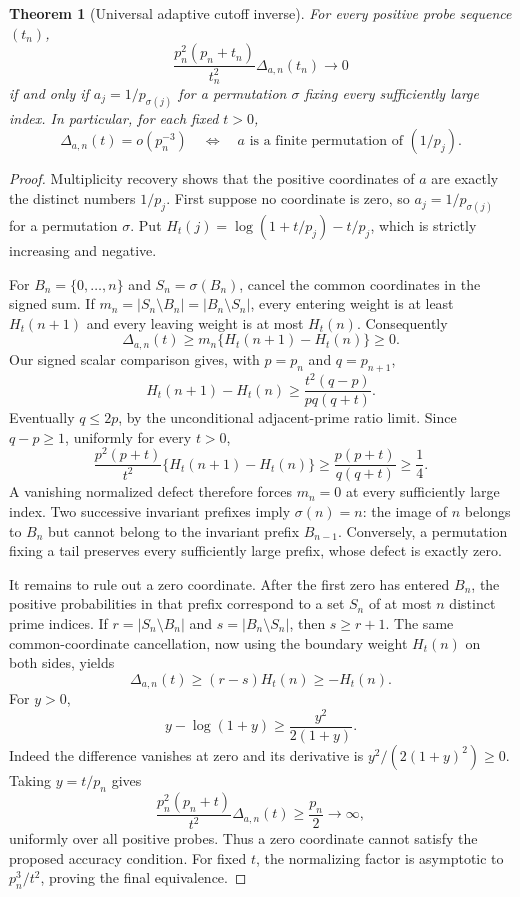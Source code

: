 \documentclass[11pt]{article}
\newtheorem{theorem}{Theorem}[section]
\theoremstyle{definition}
\begin{document}
\begin{theorem}[Universal adaptive cutoff inverse]
For every positive probe sequence $(t_n)$,
\[
 \frac{p_n^2(p_n+t_n)}{t_n^2}\Delta_{a,n}(t_n)\longrightarrow0
\]
if and only if $a_j=1/p_{\sigma(j)}$ for a permutation $\sigma$ fixing
every sufficiently large index. In particular, for each fixed $t>0$,
\[
 \Delta_{a,n}(t)=o(p_n^{-3})
 \quad\Longleftrightarrow\quad
 a\text{ is a finite permutation of }(1/p_j).
\]
\end{theorem}
\begin{proof}
Multiplicity recovery shows that the positive coordinates of $a$ are
exactly the distinct numbers $1/p_j$. First suppose no coordinate is
zero, so $a_j=1/p_{\sigma(j)}$ for a permutation $\sigma$.
Put $H_t(j)=\log(1+t/p_j)-t/p_j$, which is strictly increasing and negative.

For $B_n=\{0,\ldots,n\}$ and $S_n=\sigma(B_n)$, cancel the common
coordinates in the signed sum. If
$m_n=|S_n\setminus B_n|=|B_n\setminus S_n|$, every entering weight is
at least $H_t(n+1)$ and every leaving weight is at most $H_t(n)$.
Consequently
\[
 \Delta_{a,n}(t)\ge
 m_n\{H_t(n+1)-H_t(n)\}\ge0.                 \tag{21.1}
\]
Our signed scalar comparison gives, with $p=p_n$ and $q=p_{n+1}$,
\[
 H_t(n+1)-H_t(n)\ge\frac{t^2(q-p)}{pq(q+t)}.
\]
Eventually $q\le2p$, by the unconditional adjacent-prime ratio limit.
Since $q-p\ge1$, uniformly for every $t>0$,
\[
 \frac{p^2(p+t)}{t^2}\{H_t(n+1)-H_t(n)\}
 \ge\frac{p(p+t)}{q(q+t)}\ge\frac14.         \tag{21.2}
\]
A vanishing normalized defect therefore forces $m_n=0$ at every
sufficiently large index. Two successive invariant prefixes imply
$\sigma(n)=n$: the image of $n$ belongs to $B_n$ but cannot belong to
the invariant prefix $B_{n-1}$. Conversely, a permutation fixing a
tail preserves every sufficiently large prefix, whose defect is exactly zero.

It remains to rule out a zero coordinate. After the first zero has
entered $B_n$, the positive probabilities in that prefix correspond
to a set $S_n$ of at most $n$ distinct prime indices. If
$r=|S_n\setminus B_n|$ and $s=|B_n\setminus S_n|$, then $s\ge r+1$.
The same common-coordinate cancellation, now using the boundary
weight $H_t(n)$ on both sides, yields
\[
 \Delta_{a,n}(t)\ge(r-s)H_t(n)\ge-H_t(n).
\]
For $y>0$,
\[
 y-\log(1+y)\ge\frac{y^2}{2(1+y)}.
\]
Indeed the difference vanishes at zero and its derivative is
$y^2/(2(1+y)^2)\ge0$. Taking $y=t/p_n$ gives
\[
 \frac{p_n^2(p_n+t)}{t^2}\Delta_{a,n}(t)
 \ge\frac{p_n}{2}\longrightarrow\infty,     \tag{21.3}
\]
uniformly over all positive probes. Thus a zero coordinate cannot
satisfy the proposed accuracy condition. For fixed $t$, the
normalizing factor is asymptotic to $p_n^3/t^2$, proving the final equivalence.
\end{proof}
\end{document}
